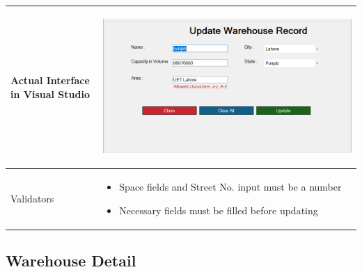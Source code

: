\documentclass[12pt,a4paper]{article}
\begin{document}
\begin{longtable}{| p{3cm}|p{12cm}|}
Actual Interface in Visual Studio  & \begin{center} \includegraphics[scale=0.3]{./User Interface1/UI-014 EditWarehouse@1x.png}\end{center}  \\ \hline

Validators & 
\begin{itemize}
\item   Space fields and Street No. input must be a number
\item  Necessary fields must be filled before updating


\end{itemize}
\\ \hline

\end{longtable}
\subsection{Warehouse Detail }
\end{document}
